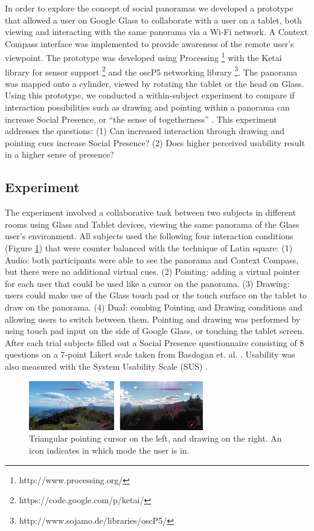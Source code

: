 In order to explore the concept of social panoramas we developed a prototype that allowed a user on Google Glass to collaborate with a user on a tablet, both viewing and interacting with the same panorama via a Wi-Fi network. A Context Compass interface \cite{Suomela2000} was implemented to provide awareness of the remote user's viewpoint. The prototype was developed using Processing \footnote{http://www.processing.org/} with the Ketai library for sensor support \footnote{https://code.google.com/p/ketai/} and the oscP5 networking library \footnote{http://www.sojamo.de/libraries/oscP5/}. The panorama was mapped onto a cylinder, viewed by rotating the tablet or the head on Glass. Using this prototype, we conducted a within-subject experiment to compare if interaction possibilities such as drawing and pointing within a panorama can increase Social Presence, or “the sense of togetherness” \cite{Basdogan2001}. This experiment addresses the questions: (1) Can increased interaction through drawing and pointing cues increase Social Presence? (2) Does higher perceived usability result in a higher sense of presence?

\subsection{Experiment}

The experiment involved a collaborative task between two subjects in different rooms using Glass and Tablet devices, viewing the same panorama of the Glass user's environment. All subjects used the following four interaction conditions (Figure \ref{fig:ismar14:pointing-drawing}) that were counter balanced with the technique of Latin square: 
(1) Audio: both participants were able to see the panorama and Context Compass, but there were no additional virtual cues. 
(2) Pointing: adding a virtual pointer for each user that could be used like a cursor on the panorama.
(3) Drawing: users could make use of the Glass touch pad or the touch surface on the tablet to draw on the panorama. 
(4) Dual: combing Pointing and Drawing conditions and allowing users to switch between them.
Pointing and drawing was performed by using touch pad input on the side of Google Glass, or touching the tablet screen. After each trial subjects filled out a Social Presence questionnaire consisting of 8 questions on a 7-point Likert scale taken from Basdogan et. al. \cite{Basdogan2001}. Usability was also measured with the System Usability Scale (SUS) \cite{brooke1996sus}.

\begin{figure}[ht]
	\centering
	\includegraphics[width=3in]{images/ismar14/pointing-drawing}
	\caption{Triangular pointing cursor on the left, and drawing on the right. An icon indicates in which mode the user is in.}
	\label{fig:ismar14:pointing-drawing}
\end{figure}

